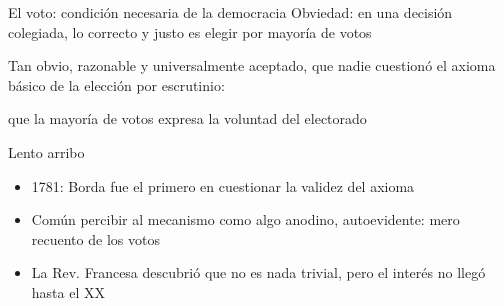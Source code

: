 \documentclass[bigger]{beamer}
\begin{document}
\begin{frame}[label={sec:org87638dc}]{El voto: condición necesaria de la democracia}
Obviedad: en una decisión colegiada, lo correcto y justo es elegir por mayoría de votos

\bigskip

Tan obvio, razonable y universalmente aceptado, que nadie cuestionó el axioma básico de la elección por escrutinio: 

que \alert{la mayoría de votos expresa la voluntad del electorado}

\pause \bigskip

\bigskip \pause
\begin{block}{Lento arribo}
\begin{itemize}
\item 1781: Borda fue el primero en cuestionar la validez del axioma
\end{itemize}
\pause
\begin{itemize}
\item Común percibir al mecanismo como algo \alert{anodino}, autoevidente: mero recuento de los votos
\item La Rev. Francesa descubrió que no es nada trivial, pero el interés no llegó hasta el XX
\end{itemize}
\end{block}
\end{frame}
\end{document}
